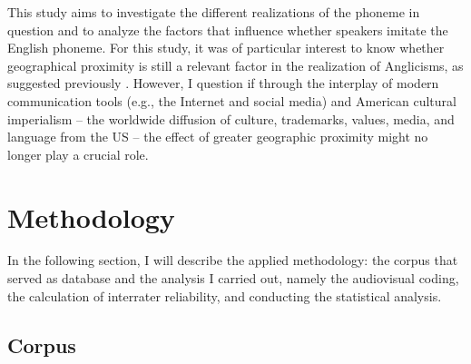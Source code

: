\documentclass[output=paper]{langscibook}
\begin{document}
This study aims to investigate the different realizations of the phoneme in question and to analyze the factors that influence whether speakers imitate the English phoneme. 
For this study, it was of particular interest to know whether geographical proximity is still a relevant factor in the realization of Anglicisms, as suggested previously \citetext{\citealp[504]{Pustka2021}; \citealp[127]{RodriguezGonzalez2017}; \citealp[116]{Oncins-Martinez2009}}.
However, I question if through the interplay of modern communication tools (e.g., the Internet and social media) and American cultural imperialism \citep[]{Gray2007,Hamm2005} – the worldwide diffusion of culture, trademarks, values, media, and language from the US – the effect of greater geographic proximity might no longer play a crucial role.


\section{Methodology}
In the following section, I will describe the applied methodology: the corpus that served as database and the analysis I carried out, namely the audiovisual coding, the calculation of interrater reliability, and conducting the statistical analysis. 

\subsection{Corpus}
\end{document}
